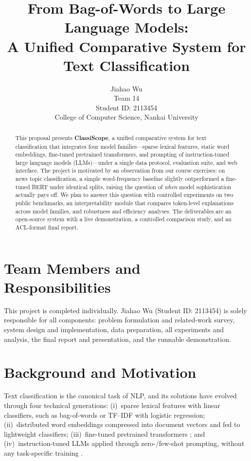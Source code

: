 \documentclass[11pt]{article}
\title{From Bag-of-Words to Large Language Models:\\ A Unified Comparative System for Text Classification}
\author{Jiahao Wu \\
  Team 14 \\
  Student ID: 2113454 \\
  College of Computer Science, Nankai University \\}
\begin{document}
\maketitle

\begin{abstract}
This proposal presents \textbf{ClassiScope}, a unified comparative system for text classification that integrates four model families---sparse lexical features, static word embeddings, fine-tuned pretrained transformers, and prompting of instruction-tuned large language models (LLMs)---under a single data protocol, evaluation suite, and web interface. The project is motivated by an observation from our course exercises: on news topic classification, a simple word-frequency baseline slightly outperformed a fine-tuned BERT under identical splits, raising the question of \emph{when} model sophistication actually pays off. We plan to answer this question with controlled experiments on two public benchmarks, an interpretability module that compares token-level explanations across model families, and robustness and efficiency analyses. The deliverables are an open-source system with a live demonstration, a controlled comparison study, and an ACL-format final report.
\end{abstract}

\section{Team Members and Responsibilities}

This project is completed individually. Jiahao Wu (Student ID: 2113454) is solely responsible for all components: problem formulation and related-work survey, system design and implementation, data preparation, all experiments and analysis, the final report and presentation, and the runnable demonstration.

\section{Background and Motivation}

Text classification is the canonical task of NLP, and its solutions have evolved through four technical generations: (i)~sparse lexical features with linear classifiers, such as bag-of-words or TF--IDF with logistic regression; (ii)~distributed word embeddings \citep{mikolov2013efficient,pennington2014glove} compressed into document vectors and fed to lightweight classifiers; (iii)~fine-tuned pretrained transformers \citep{vaswani2017attention,devlin-etal-2019-bert}; and (iv)~instruction-tuned LLMs applied through zero-/few-shot prompting, without any task-specific training \citep{brown2020language,ouyang2022training,qwen2025}.
\end{document}
